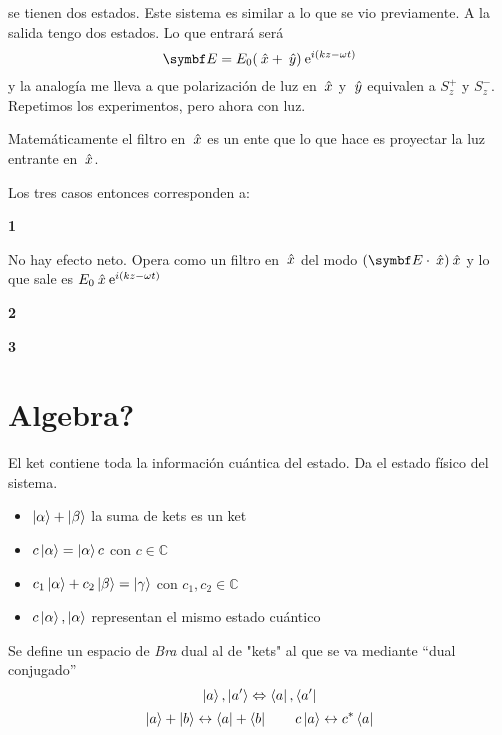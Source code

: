 \documentclass[10pt,oneside]{CBFT_book}
\begin{document}
se tienen dos estados. Este sistema es similar a lo que se vio previamente. A la salida tengo
dos estados.
Lo que entrará será 
\[
	\vb E = E_0 ( \xver + \yver ) \euler^{i( kz - \omega t)}
\]
y la analogía me lleva a que polarización de luz en $\:\hat{x}$ y $\:\hat{y}$ equivalen a $S_z^+$ y $S_z^-$.
Repetimos los experimentos, pero ahora con luz.

Matemáticamente el filtro en $\:\hat{x}$ es un ente que lo que hace es proyectar la luz entrante
en $\:\hat{x}$.

Los tres casos entonces corresponden a:

{\bf 1}



No hay efecto neto. Opera como un filtro en $\:\hat{x}$ del modo $(\vb E\cdot\xver)\xver$
y lo que sale es $E_0 \:\hat{x} \:\mathrm{e}^{i( kz - \omega t)}$

{\bf 2}


{\bf 3}

\section{Algebra?}

El ket contiene toda la información cuántica del estado. Da el estado físico del sistema.
\begin{itemize}
 \item $\Ket{\alpha} + \Ket{\beta}$ la suma de kets es un ket
 \item $c\Ket{\alpha}= \Ket{\alpha} c$ con $c\in\mathbb{C}$
 \item  $c_1\Ket{\alpha} + c_2\Ket{\beta} = \Ket{\gamma}$ con $c_1,c_2 \in \mathbb{C}$
 \item $c\Ket{\alpha},\Ket{\alpha}$ representan el mismo estado cuántico
\end{itemize}

Se define un espacio de {\it Bra} dual al de "kets" al que se va mediante ``dual conjugado''
\[
	\Ket{a}, \Ket{a'} \Leftrightarrow \Bra{a}, \Bra{a'}
\]
\[
	\Ket{a} + \Ket{b} \leftrightarrow \Bra{a} + \Bra{b} \qquad 
	c\Ket{a} \leftrightarrow c^*\Bra{a}
\]
\end{document}
